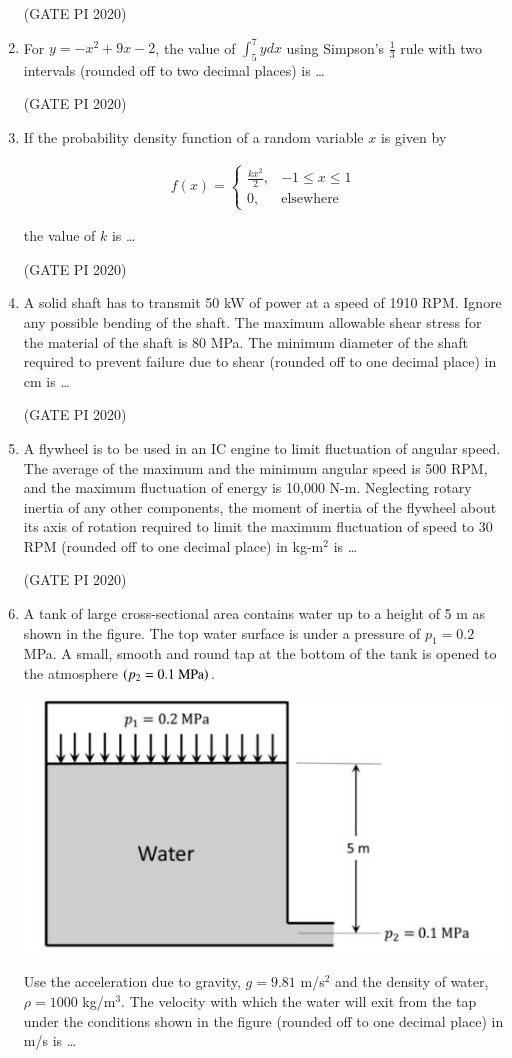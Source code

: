 \documentclass[journal,12pt,onecolumn]{IEEEtran}
\theoremstyle{remark}
\begin{document}
\begin{enumerate}
\hfill (GATE PI 2020)

\item For $y = -x^2 + 9x - 2$, the value of $\int_5^7 ydx$ using Simpson's $\frac{1}{3}$ rule with two intervals (rounded off to two decimal places) is \dots

\hfill (GATE PI 2020)

\item If the probability density function of a random variable $x$ is given by

\begin{align*}
f(x) =
\begin{cases}
\frac{kx^2}{2}, & -1 \leq x \leq 1 \\
0, & \text{elsewhere}
\end{cases}
\end{align*}

the value of $k$ is \dots

\hfill (GATE PI 2020)

\item A solid shaft has to transmit 50 kW of power at a speed of 1910 RPM. Ignore any possible bending of the shaft. The maximum allowable shear stress for the material of the shaft is 80 MPa. The minimum diameter of the shaft required to prevent failure due to shear (rounded off to one decimal place) in cm is \dots

\hfill (GATE PI 2020)

\item A flywheel is to be used in an IC engine to limit fluctuation of angular speed. The average of the maximum and the minimum angular speed is 500 RPM, and the maximum fluctuation of energy is 10,000 N-m. Neglecting rotary inertia of any other components, the moment of inertia of the flywheel about its axis of rotation required to limit the maximum fluctuation of speed to 30 RPM (rounded off to one decimal place) in kg-m$^2$ is \dots

\hfill (GATE PI 2020)

\item A tank of large cross-sectional area contains water up to a height of 5 m as shown in the figure. The top water surface is under a pressure of $p_1 = 0.2$ MPa. A small, smooth and round tap at the bottom of the tank is opened to the atmosphere $\left(p_2 = 0.1\text{ MPa}\right)$.\
\begin{center}
\includegraphics[width=0.5\columnwidth]{figs/fig14.png}
\end{center}
Use the acceleration due to gravity, $g = 9.81$ m/s$^2$ and the density of water, $\rho = 1000$ kg/m$^3$. The velocity with which the water will exit from the tap under the conditions shown in the figure (rounded off to one decimal place) in m/s is \dots 


\end{enumerate}
\end{document}

